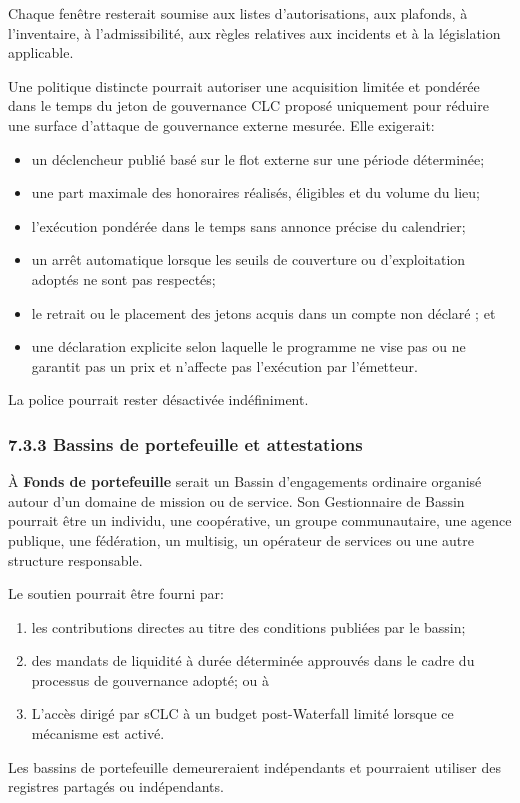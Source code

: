 \documentclass[11pt]{article}
\begin{document}
Chaque fenêtre resterait soumise aux listes d'autorisations, aux plafonds, à l'inventaire, à l'admissibilité, aux règles relatives aux incidents et à la législation applicable.

Une politique distincte pourrait autoriser une acquisition limitée et pondérée dans le temps du jeton de gouvernance CLC proposé uniquement pour réduire une surface d'attaque de gouvernance externe mesurée. Elle exigerait:

\begin{itemize}[leftmargin=*]
\item un déclencheur publié basé sur le flot externe sur une période déterminée;
\item une part maximale des honoraires réalisés, éligibles et du volume du lieu;
\item l'exécution pondérée dans le temps sans annonce précise du calendrier;
\item un arrêt automatique lorsque les seuils de couverture ou d'exploitation adoptés ne sont pas respectés;
\item le retrait ou le placement des jetons acquis dans un compte non déclaré ; et
\item une déclaration explicite selon laquelle le programme ne vise pas ou ne garantit pas un prix et n'affecte pas l'exécution par l'émetteur.
\end{itemize}
La police pourrait rester désactivée indéfiniment.

\subsubsection*{7.3.3 Bassins de portefeuille et attestations}

À \textbf{Fonds de portefeuille} serait un Bassin d'engagements ordinaire organisé autour d'un domaine de mission ou de service. Son Gestionnaire de Bassin pourrait être un individu, une coopérative, un groupe communautaire, une agence publique, une fédération, un multisig, un opérateur de services ou une autre structure responsable.

Le soutien pourrait être fourni par:

\begin{enumerate}[leftmargin=*]
\item les contributions directes au titre des conditions publiées par le bassin;
\item des mandats de liquidité à durée déterminée approuvés dans le cadre du processus de gouvernance adopté; ou à
\item L'accès dirigé par sCLC à un budget post-Waterfall limité lorsque ce mécanisme est activé.
\end{enumerate}
Les bassins de portefeuille demeureraient indépendants et pourraient utiliser des registres partagés ou indépendants.
\end{document}
